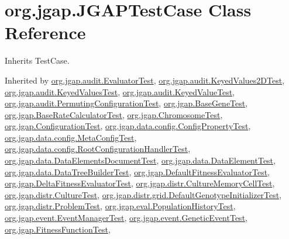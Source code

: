 \hypertarget{classorg_1_1jgap_1_1_j_g_a_p_test_case}{\section{org.\-jgap.\-J\-G\-A\-P\-Test\-Case Class Reference}
\label{classorg_1_1jgap_1_1_j_g_a_p_test_case}
}


Inherits Test\-Case.



Inherited by \hyperlink{classorg_1_1jgap_1_1audit_1_1_evaluator_test}{org.\-jgap.\-audit.\-Evaluator\-Test}, \hyperlink{classorg_1_1jgap_1_1audit_1_1_keyed_values2_d_test}{org.\-jgap.\-audit.\-Keyed\-Values2\-D\-Test}, \hyperlink{classorg_1_1jgap_1_1audit_1_1_keyed_values_test}{org.\-jgap.\-audit.\-Keyed\-Values\-Test}, \hyperlink{classorg_1_1jgap_1_1audit_1_1_keyed_value_test}{org.\-jgap.\-audit.\-Keyed\-Value\-Test}, \hyperlink{classorg_1_1jgap_1_1audit_1_1_permuting_configuration_test}{org.\-jgap.\-audit.\-Permuting\-Configuration\-Test}, \hyperlink{classorg_1_1jgap_1_1_base_gene_test}{org.\-jgap.\-Base\-Gene\-Test}, \hyperlink{classorg_1_1jgap_1_1_base_rate_calculator_test}{org.\-jgap.\-Base\-Rate\-Calculator\-Test}, \hyperlink{classorg_1_1jgap_1_1_chromosome_test}{org.\-jgap.\-Chromosome\-Test}, \hyperlink{classorg_1_1jgap_1_1_configuration_test}{org.\-jgap.\-Configuration\-Test}, \hyperlink{classorg_1_1jgap_1_1data_1_1config_1_1_config_property_test}{org.\-jgap.\-data.\-config.\-Config\-Property\-Test}, \hyperlink{classorg_1_1jgap_1_1data_1_1config_1_1_meta_config_test}{org.\-jgap.\-data.\-config.\-Meta\-Config\-Test}, \hyperlink{classorg_1_1jgap_1_1data_1_1config_1_1_root_configuration_handler_test}{org.\-jgap.\-data.\-config.\-Root\-Configuration\-Handler\-Test}, \hyperlink{classorg_1_1jgap_1_1data_1_1_data_elements_document_test}{org.\-jgap.\-data.\-Data\-Elements\-Document\-Test}, \hyperlink{classorg_1_1jgap_1_1data_1_1_data_element_test}{org.\-jgap.\-data.\-Data\-Element\-Test}, \hyperlink{classorg_1_1jgap_1_1data_1_1_data_tree_builder_test}{org.\-jgap.\-data.\-Data\-Tree\-Builder\-Test}, \hyperlink{classorg_1_1jgap_1_1_default_fitness_evaluator_test}{org.\-jgap.\-Default\-Fitness\-Evaluator\-Test}, \hyperlink{classorg_1_1jgap_1_1_delta_fitness_evaluator_test}{org.\-jgap.\-Delta\-Fitness\-Evaluator\-Test}, \hyperlink{classorg_1_1jgap_1_1distr_1_1_culture_memory_cell_test}{org.\-jgap.\-distr.\-Culture\-Memory\-Cell\-Test}, \hyperlink{classorg_1_1jgap_1_1distr_1_1_culture_test}{org.\-jgap.\-distr.\-Culture\-Test}, \hyperlink{classorg_1_1jgap_1_1distr_1_1grid_1_1_default_genotype_initializer_test}{org.\-jgap.\-distr.\-grid.\-Default\-Genotype\-Initializer\-Test}, \hyperlink{classorg_1_1jgap_1_1distr_1_1_problem_test}{org.\-jgap.\-distr.\-Problem\-Test}, \hyperlink{classorg_1_1jgap_1_1eval_1_1_population_history_test}{org.\-jgap.\-eval.\-Population\-History\-Test}, \hyperlink{classorg_1_1jgap_1_1event_1_1_event_manager_test}{org.\-jgap.\-event.\-Event\-Manager\-Test}, \hyperlink{classorg_1_1jgap_1_1event_1_1_genetic_event_test}{org.\-jgap.\-event.\-Genetic\-Event\-Test}, \hyperlink{classorg_1_1jgap_1_1_fitness_function_test}{org.\-jgap.\-Fitness\-Function\-Test}, 
